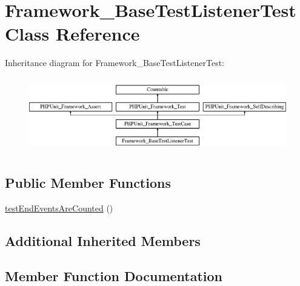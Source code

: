 \hypertarget{class_framework___base_test_listener_test}{}\section{Framework\+\_\+\+Base\+Test\+Listener\+Test Class Reference}
\label{class_framework___base_test_listener_test}
Inheritance diagram for Framework\+\_\+\+Base\+Test\+Listener\+Test\+:\begin{figure}[H]
\begin{center}
\leavevmode
\includegraphics[height=3.303835cm]{class_framework___base_test_listener_test}
\end{center}
\end{figure}
\subsection*{Public Member Functions}
\begin{DoxyCompactItemize}
\item 
\mbox{\hyperlink{class_framework___base_test_listener_test_abe892bbe7302dd213bb82d8f851ea03f}{test\+End\+Events\+Are\+Counted}} ()
\end{DoxyCompactItemize}
\subsection*{Additional Inherited Members}


\subsection{Member Function Documentation}
\mbox{\label{class_framework___base_test_listener_test_abe892bbe7302dd213bb82d8f851ea03f}} 
